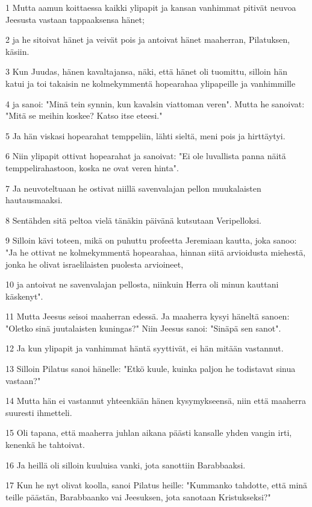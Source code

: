 \par 1 Mutta aamun koittaessa kaikki ylipapit ja kansan vanhimmat pitivät neuvoa Jeesusta vastaan tappaaksensa hänet;
\par 2 ja he sitoivat hänet ja veivät pois ja antoivat hänet maaherran, Pilatuksen, käsiin.
\par 3 Kun Juudas, hänen kavaltajansa, näki, että hänet oli tuomittu, silloin hän katui ja toi takaisin ne kolmekymmentä hopearahaa ylipapeille ja vanhimmille
\par 4 ja sanoi: "Minä tein synnin, kun kavalsin viattoman veren". Mutta he sanoivat: "Mitä se meihin koskee? Katso itse eteesi."
\par 5 Ja hän viskasi hopearahat temppeliin, lähti sieltä, meni pois ja hirttäytyi.
\par 6 Niin ylipapit ottivat hopearahat ja sanoivat: "Ei ole luvallista panna näitä temppelirahastoon, koska ne ovat veren hinta".
\par 7 Ja neuvoteltuaan he ostivat niillä savenvalajan pellon muukalaisten hautausmaaksi.
\par 8 Sentähden sitä peltoa vielä tänäkin päivänä kutsutaan Veripelloksi.
\par 9 Silloin kävi toteen, mikä on puhuttu profeetta Jeremiaan kautta, joka sanoo: "Ja he ottivat ne kolmekymmentä hopearahaa, hinnan siitä arvioidusta miehestä, jonka he olivat israelilaisten puolesta arvioineet,
\par 10 ja antoivat ne savenvalajan pellosta, niinkuin Herra oli minun kauttani käskenyt".
\par 11 Mutta Jeesus seisoi maaherran edessä. Ja maaherra kysyi häneltä sanoen: "Oletko sinä juutalaisten kuningas?" Niin Jeesus sanoi: "Sinäpä sen sanot".
\par 12 Ja kun ylipapit ja vanhimmat häntä syyttivät, ei hän mitään vastannut.
\par 13 Silloin Pilatus sanoi hänelle: "Etkö kuule, kuinka paljon he todistavat sinua vastaan?"
\par 14 Mutta hän ei vastannut yhteenkään hänen kysymykseensä, niin että maaherra suuresti ihmetteli.
\par 15 Oli tapana, että maaherra juhlan aikana päästi kansalle yhden vangin irti, kenenkä he tahtoivat.
\par 16 Ja heillä oli silloin kuuluisa vanki, jota sanottiin Barabbaaksi.
\par 17 Kun he nyt olivat koolla, sanoi Pilatus heille: "Kummanko tahdotte, että minä teille päästän, Barabbaanko vai Jeesuksen, jota sanotaan Kristukseksi?"
